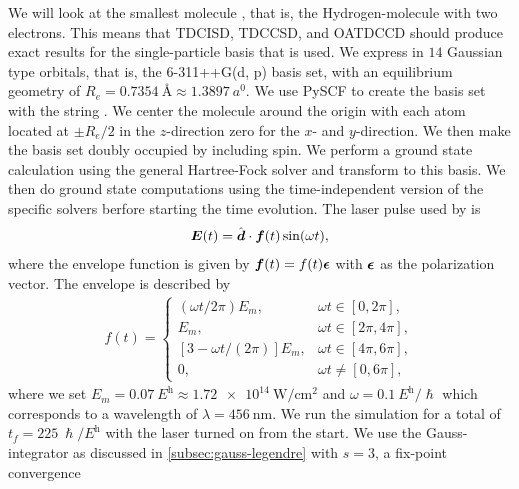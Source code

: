         We will look at the smallest molecule , that is, the
        Hydrogen-molecule with two electrons.
        This means that TDCISD, TDCCSD, and OATDCCD should produce exact
        results for the single-particle basis that is used.
        We express  in $14$ Gaussian type orbitals, that is, the
        6-311++G(d, p) basis set, with an equilibrium geometry of $R_e =
        \SI{0.7354}{\angstrom} \approx \SI{1.3897}{\bohr}$.
        We use PySCF \cite{pyscf} to create the basis set with the string
        .
        We center the molecule around the origin with each atom located at
        $\pm R_e/2$ in the $z$-direction zero for the $x$- and
        $y$-direction.
        We then make the basis set doubly occupied by including spin.
        We perform a ground state calculation using the general Hartree-Fock
        solver and transform to this basis.
        We then do ground state computations using the time-independent version
        of the specific solvers berfore starting the time evolution.
        The laser pulse used by \citeauthor{li_2005} is
        \begin{align}
            \boldsymbol{E}(t)
            = \hat{\boldsymbol{d}} \cdot \boldsymbol{f}(t)\sin(\omega t),
            \label{eq:li-field}
        \end{align}
        where the envelope function is given by $\boldsymbol{f}(t) =
        f(t)\boldsymbol{\epsilon}$ with $\boldsymbol{\epsilon}$ as the polarization vector.
        The envelope is described by
        \begin{align}
            f(t) = \begin{cases}
                (\omega t / 2\pi) E_m, & \omega t \in [0, 2\pi], \\
                E_m, & \omega t \in [2\pi, 4\pi], \\
                [3 - \omega t / (2\pi)] E_m, & \omega t \in [4\pi, 6\pi], \\
                0, & \omega t \neq [0, 6\pi],
            \end{cases}
            \label{eq:li-laser}
        \end{align}
        where we set $E_m = \SI{0.07}{\hartree} \approx
        \SI{1.72e14}{\watt/\cm^2}$ and $\omega =
        \SI{0.1}{\hartree/\hslash}$ which corresponds to a wavelength of
        $\lambda = \SI{456}{\nano\meter}$.
        We run the simulation for a total of $t_f = \SI{225}{\hslash/\hartree}$
        with the laser turned on from the start.
        We use the Gauss-integrator as discussed in
        \autoref{subsec:gauss-legendre} with $s = 3$, a fix-point convergence
